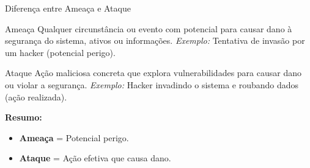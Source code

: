 \begin{frame}{Diferença entre Ameaça e Ataque}

\begin{block}{Ameaça}
Qualquer circunstância ou evento com potencial para causar dano à segurança do sistema, ativos ou informações.  
\textit{Exemplo:} Tentativa de invasão por um hacker (potencial perigo).
\end{block}

\begin{block}{Ataque}
Ação maliciosa concreta que explora vulnerabilidades para causar dano ou violar a segurança.  
\textit{Exemplo:} Hacker invadindo o sistema e roubando dados (ação realizada).
\end{block}

\vspace{0.5cm}
\textbf{Resumo:}  
\begin{itemize}
    \item \textbf{Ameaça} = Potencial perigo.  
    \item \textbf{Ataque} = Ação efetiva que causa dano.
\end{itemize}

\end{frame}



